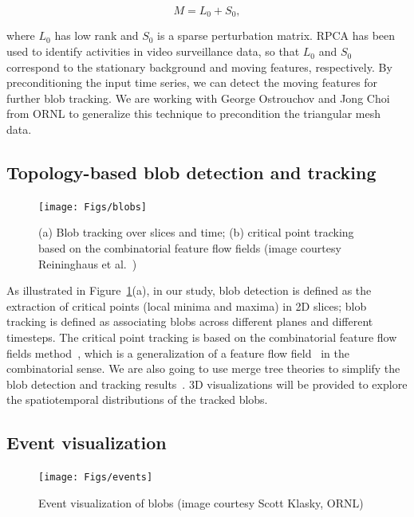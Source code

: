 \begin{equation}
M = L_0 + S_0, 
\end{equation}

\noindent where $L_0$ has low rank and $S_0$ is a sparse perturbation matrix.  RPCA has been used to identify activities in video surveillance data, so that $L_0$ and $S_0$ correspond to the stationary background and moving features, respectively.  By preconditioning the input time series, we can detect the moving features for further blob tracking.  We are working with George Ostrouchov and Jong Choi from ORNL to generalize this technique to precondition the triangular mesh data.  


\subsection{Topology-based blob detection and tracking}

\begin{figure}[!h]
  \centering
  \texttt{[image: Figs/blobs]}
  \caption{(a) Blob tracking over slices and time; (b) critical point tracking based on the combinatorial feature flow fields (image courtesy Reininghaus et al.~\cite{ReininghausKWH12})}
  \label{fig:blob}
\end{figure}

As illustrated in Figure~\ref{fig:blob}(a), in our study, blob detection is defined as the extraction of critical points (local minima and maxima) in 2D slices; blob tracking is defined as associating blobs across different planes and different timesteps.  The critical point tracking is based on the combinatorial feature flow fields method~\cite{ReininghausKWH12}, which is a generalization of a feature flow field~\cite{TheiselS03} in the combinatorial sense.  We are also going to use merge tree theories to simplify the blob detection and tracking results~\cite{OesterlingHWMS17}.  3D visualizations will be provided to explore the spatiotemporal distributions of the tracked blobs.  




\subsection{Event visualization}

\begin{figure}[!h]
  \centering
  \texttt{[image: Figs/events]}
  \caption{Event visualization of blobs (image courtesy Scott Klasky, ORNL)}
  \label{fig:events}
\end{figure}

